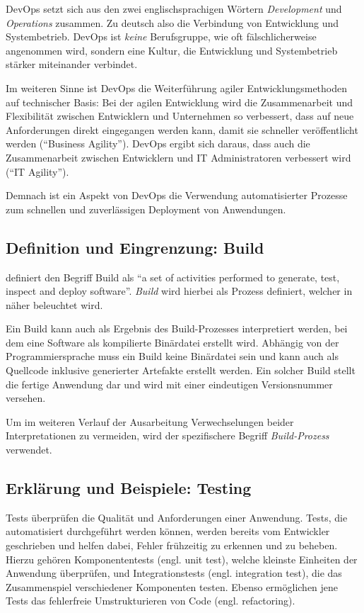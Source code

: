 DevOps setzt sich aus den zwei englischsprachigen Wörtern \emph{Development} und \emph{Operations} zusammen. Zu deutsch also die Verbindung von Entwicklung und Systembetrieb. DevOps ist \emph{keine} Berufsgruppe, wie oft fälschlicherweise angenommen wird, sondern eine Kultur, die Entwicklung und Systembetrieb stärker miteinander verbindet.

Im weiteren Sinne ist DevOps die Weiterführung agiler Entwicklungsmethoden auf technischer Basis: Bei der agilen Entwicklung wird die Zusammenarbeit und Flexibilität zwischen Entwicklern und Unternehmen so verbessert, dass auf neue Anforderungen direkt eingegangen werden kann, damit sie schneller veröffentlicht werden (``Business Agility''). DevOps ergibt sich daraus, dass auch die Zusammenarbeit zwischen Entwicklern und IT Administratoren verbessert wird (``IT Agility''). \citep[4f]{Chapman2014}

Demnach ist ein Aspekt von DevOps die Verwendung automatisierter Prozesse zum schnellen und zuverlässigen Deployment von Anwendungen.

\subsection{Definition und Eingrenzung: Build}
\label{subsec:build}

\citet[27]{Duvall2007} definiert den Begriff Build als ``a set of activities performed to generate, test, inspect and deploy software''. \emph{Build} wird hierbei als Prozess definiert, welcher in  näher beleuchtet wird.

Ein Build kann auch als Ergebnis des Build-Prozesses interpretiert werden, bei dem eine Software als kompilierte Binärdatei erstellt wird. Abhängig von der Programmiersprache muss ein Build keine Binärdatei sein und kann auch als Quellcode inklusive generierter Artefakte erstellt werden. Ein solcher Build stellt die fertige Anwendung dar und wird mit einer eindeutigen Versionsnummer versehen.

Um im weiteren Verlauf der Ausarbeitung Verwechselungen beider Interpretationen zu vermeiden, wird der spezifischere Begriff \emph{Build-Prozess} verwendet.

\subsection{Erklärung und Beispiele: Testing}
\label{subsec:def-testing}

Tests überprüfen die Qualität und Anforderungen einer Anwendung. Tests, die automatisiert durchgeführt werden können, werden bereits vom Entwickler geschrieben und helfen dabei, Fehler frühzeitig zu erkennen und zu beheben. Hierzu gehören Komponententests (engl. unit test), welche kleinste Einheiten der Anwendung überprüfen, und Integrationstests (engl. integration test), die das Zusammenspiel verschiedener Komponenten testen. Ebenso ermöglichen jene Tests das fehlerfreie Umstrukturieren von Code (engl. refactoring). \citep[104f]{Wolff2016}

